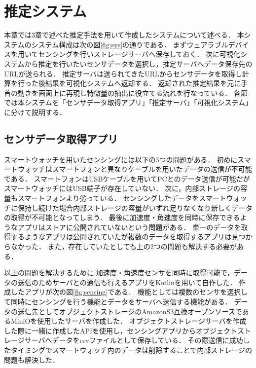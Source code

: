 \chapter{推定システム}
本章では3章で述べた推定手法を用いて作成したシステムについて述べる．
本システムのシステム構成は次の図\ref{fig:sys}の通りである．
まずウェアラブルデバイスを用いてセンシングを行いストレージサーバへ保存しておく．
次に可視化システムから推定を行いたいセンサデータを選択し，推定サーバへデータ保存先のURLが送られる．
推定サーバは送られてきたURLからセンサデータを取得し計算を行った後結果を可視化システムへ返却する．
返却された推定結果を元に手首の動きを画面上に再現し特徴量の抽出に役立てる流れを行なっている．
各節では本システムを「センサデータ取得アプリ」「推定サーバ」「可視化システム」に分けて説明する．
\section{センサデータ取得アプリ}
スマートウォッチを用いたセンシングには以下の3つの問題がある．
初めにスマートウォッチはスマートフォンと異なりケーブルを用いたデータの送信が不可能である．
スマートフォンはUSBケーブルを用いてPCとのデータ送信が可能だがスマートウォッチにはUSB端子が存在していない．
次に，内部ストレージの容量もスマートフォンより劣っている．
センシングしたデータをスマートウォッチに保持し続けた場合内部ストレージの容量がいずれ足りなくなり新しくデータの取得が不可能となってしまう．
最後に加速度・角速度を同時に保存できるようなアプリはストアに公開されていないという問題がある．
単一のデータを取得するようなアプリは公開されていたが複数のデータを取得するアプリは見つからなかった．
また，存在していたとしても上の2つの問題も解決する必要がある．

以上の問題を解決するために
加速度・角速度センサを同時に取得可能で，データの送信のためサーバとの通信も行えるアプリをKotlinを用いて自作した．
作成したアプリが次の図\ref{fig:sensing}である．
機能としては複数のセンサを選択して同時にセンシングを行う機能とデータをサーバへ送信する機能がある．
データの送信先としてオブジェクトストレージのAmazonS3互換オープンソースであるMiniOを使用したサーバを作成した．
オブジェクトストレージサーバを作成した際に一緒に作成したAPIを使用し，センシングアプリからオブジェクトストレージサーバへデータをcsvファイルとして保存している．
その際送信に成功したタイミングでスマートウォッチ内のデータは削除することで内部ストレージの問題も解決した．



